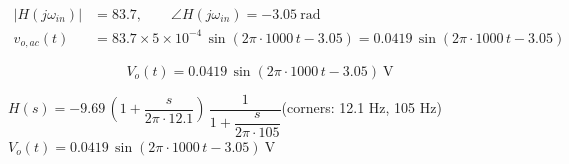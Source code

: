 \documentclass[11pt]{article}
\begin{document}
\begin{align*}
|H(j\omega_{in})| &= 83.7, \qquad \angle H(j\omega_{in}) = -3.05\ \mathrm{rad} \\
v_{o,ac}(t) &= 83.7\times 5\times 10^{-4}\,\sin\left(2\pi\cdot 1000\,t - 3.05\right) = 0.0419\,\sin\left(2\pi\cdot 1000\,t - 3.05\right)
\end{align*}

\[
\boxed{V_o(t) = 0.0419\,\sin\left(2\pi\cdot 1000\,t - 3.05\right)\ \mathrm{V}}
\]

\begin{ansbox}
$H(s) = -9.69\,\left(1+\dfrac{s}{2\pi\cdot 12.1}\right)\,\dfrac{1}{1+\dfrac{s}{2\pi\cdot 105}}$\quad (corners: 12.1 Hz, 105 Hz)\\[4pt]
$V_o(t) = 0.0419\,\sin\left(2\pi\cdot 1000\,t - 3.05\right)\ \mathrm{V}$
\end{ansbox}
\end{document}
